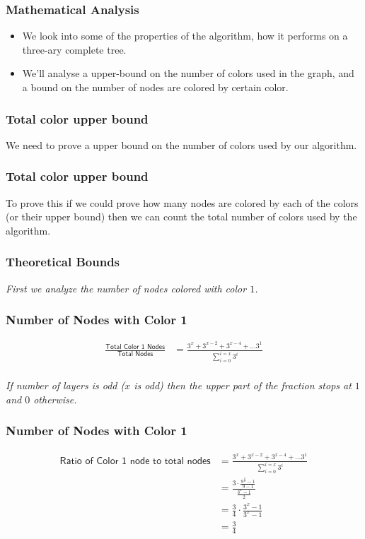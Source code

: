 \begin{frame}
    \frametitle{Mathematical Analysis}

    
    \begin{itemize}
        \item We look into some of the properties of the algorithm, how it performs on a three-ary complete tree.\pause[]
        \item We'll analyse a upper-bound on the number of colors used in the graph, and a bound on the number of nodes are colored by certain color.
    \end{itemize} 
\end{frame}

\begin{frame}
    \frametitle{Total color upper bound}

    We need to prove a upper bound on the number of colors used by our algorithm.    

\end{frame}

\begin{frame}
    \frametitle{Total color upper bound}

    To prove this if we could prove how many nodes are colored by each of the colors (or their upper bound) then we can count the total number of colors used by the algorithm.    

\end{frame}


\begin{frame}
    \frametitle{Theoretical Bounds}

    \textit{First we analyze the number of nodes colored with color $1$.}
\end{frame}

\begin{frame}
    \frametitle{Number of Nodes with Color 1}

    \begin{align*}
        \frac{\textsf{Total Color 1 Nodes}}{\textsf{Total Nodes}} &= \frac{3^{x} + 3^{x - 2} + 3^{x-4} + \dots 3^{1}}{\displaystyle\sum_{i = 0} ^{i = x} 3^i}\\
    \end{align*}

    \textit{If number of layers is odd ($x$ is odd) then the upper part of the fraction stops at $1$ and $0$ otherwise.}

\end{frame}

\begin{frame}
    \frametitle{Number of Nodes with Color 1}

    \begin{align*}
        \textsf{Ratio of Color 1 node to total nodes} &= \frac{3^{x} + 3^{x - 2} + 3^{x-4} + \dots 3^{1}}{\displaystyle\sum_{i = 0} ^{i = x} 3^i}\\
        &= \frac{3 \cdot \frac{9^{\frac{x}{2}} - 1}{9 - 1}}{\frac{3^x - 1}{2}}\\
        &= \frac{3}{4} \cdot \frac{3^x - 1}{3^x - 1}\\
        &= \frac{3}{4}
    \end{align*}    

\end{frame}

